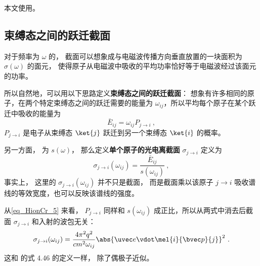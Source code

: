 
本文使用。

\subsection{束缚态之间的跃迁截面}
对于频率为 $\omega$ 的， 截面可以想象成与电磁波传播方向垂直放置的一块面积为 $\sigma(\omega)$ 的面元， 使得原子从电磁波中吸收的平均功率恰好等于电磁波经过该面元的功率。

所以自然地，可以用以下思路定义\textbf{束缚态之间的跃迁截面}： 想象有许多相同的原子，在两个特定束缚态之间的跃迁需要的能量为 $\omega_{ij}$，所以平均每个原子在某个跃迁中吸收的能量为
\begin{equation}
\bar E_{ij} = \omega_{ij}P_{j\to i}~,
\end{equation}
$P_{j\to i}$ 是电子从束缚态 $\ket{j}$ 跃迁到另一个束缚态 $\ket{i}$ 的概率。

另一方面， 为 $s(\omega)$， 那么定义\textbf{单个原子的光电离截面} $\sigma_{j\to i}$ 定义为
\begin{equation}
\sigma_{j\to i}(\omega_{ij}) = \frac{\bar E_{ij}}{s(\omega_{ij})}~,
\end{equation}
事实上， 这里的 $\sigma_{j\to i}(\omega_{ij})$ 并不只是截面， 而是截面乘以该原子 $j\to i$ 吸收谱线的等效宽度，也可以反映该谱线的强度。

从\autoref{eq_HionCr_5}  来看， $P_{j\to i}$ 同样和 $s(\omega_{ij})$ 成正比，所以从两式中消去后截面 $\sigma_{j\to i}$ 和入射的波包无关：
\begin{equation}
\sigma_{j\to i}(\omega_{ij}) = \frac{4\pi^2 q^2}{c m^2 \omega_{ij}} \abs{\uvec e \vdot\mel{i}{\bvec p}{j}}^2~.
\end{equation}
这和 \cite{Bransden} 的式 4.46 的定义一样， 除了偶极子近似。

